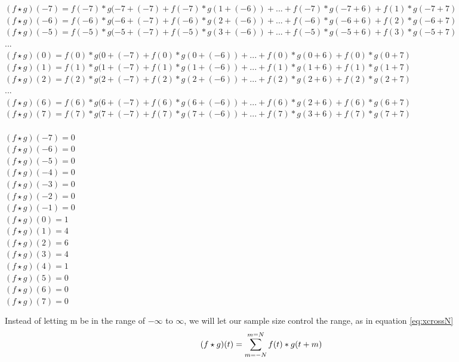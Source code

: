 \begin{center}
$(f\star g)(-7)=f(-7)*g(-7+(-7)+f(-7)*g(1+(-6))+...+f(-7)*g(-7+6)+f(1)*g(-7+7)$\\
$(f\star g)(-6)=f(-6)*g(-6+(-7)+f(-6)*g(2+(-6))+...+f(-6)*g(-6+6)+f(2)*g(-6+7)$\\
$(f\star g)(-5)=f(-5)*g(-5+(-7)+f(-5)*g(3+(-6))+...+f(-5)*g(-5+6)+f(3)*g(-5+7)$\\
$...$\\
$(f\star g)(0)=f(0)*g(0+(-7)+f(0)*g(0+(-6))+...+f(0)*g(0+6)+f(0)*g(0+7)$\\
$(f\star g)(1)=f(1)*g(1+(-7)+f(1)*g(1+(-6))+...+f(1)*g(1+6)+f(1)*g(1+7)$\\
$(f\star g)(2)=f(2)*g(2+(-7)+f(2)*g(2+(-6))+...+f(2)*g(2+6)+f(2)*g(2+7)$\\
$...$\\
$(f\star g)(6)=f(6)*g(6+(-7)+f(6)*g(6+(-6))+...+f(6)*g(2+6)+f(6)*g(6+7)$\\
$(f\star g)(7)=f(7)*g(7+(-7)+f(7)*g(7+(-6))+...+f(7)*g(3+6)+f(7)*g(7+7)$\\
\ \\
$(f\star g)(-7)=0$\\
$(f\star g)(-6)=0$\\
$(f\star g)(-5)=0$\\
$(f\star g)(-4)=0$\\
$(f\star g)(-3)=0$\\
$(f\star g)(-2)=0$\\
$(f\star g)(-1)=0$\\
$(f\star g)(0)=1$\\
$(f\star g)(1)=4$\\
$(f\star g)(2)=6$\\
$(f\star g)(3)=4$\\
$(f\star g)(4)=1$\\
$(f\star g)(5)=0$\\
$(f\star g)(6)=0$\\
$(f\star g)(7)=0$\\
\end{center}

Instead of letting m be in the range of $-\infty$ to $\infty$, we will let our sample size control the range, as in equation \ref{eq:xcrossN}
\begin{equation}
\label{eq:xcrossN}
\centering
(f\star g)(t)=\sum\limits_{m=-N}^{m=N}f(t)*g(t+m)
\end{equation}


